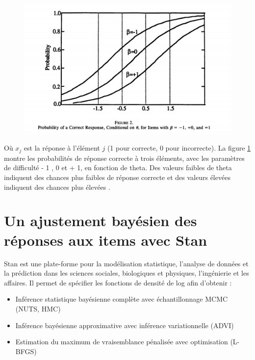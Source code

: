 \begin{figure}[H]
	\begin{center}
		\includegraphics[width=\textwidth]{images/chapitre5/parameters_probability.png}
	\end{center}
	\caption{}
	\label{parameters_probability}
\end{figure}
Où \(\displaystyle x_{j} \)  est la réponse à l'élément \(\displaystyle j \) (1 pour correcte, 0 pour incorrecte). La figure \ref{parameters_probability} montre les probabilités de réponse correcte à trois éléments, avec les paramètres de difficulté - 1 , 0 et + 1, en fonction de theta. Des valeurs faibles de theta indiquent des chances plus faibles de réponse correcte et des valeurs élevées indiquent des chances plus élevées \cite{mislevy1994evidence}.

\section{Un ajustement bayésien des réponses aux items avec Stan}
Stan est une plate-forme pour la modélisation statistique, l'analyse de données et la prédiction dans les sciences sociales, biologiques et physiques, l'ingénierie et les affaires.
Il permet de spécifier les fonctions de densité de log afin d’obtenir :

\begin{itemize}
	\item Inférence statistique bayésienne complète avec échantillonnage MCMC (NUTS, HMC)
	\item Inférence bayésienne approximative avec inférence variationnelle (ADVI)
	\item Estimation du maximum de vraisemblance pénalisée avec optimisation (L-BFGS)
\end{itemize}

